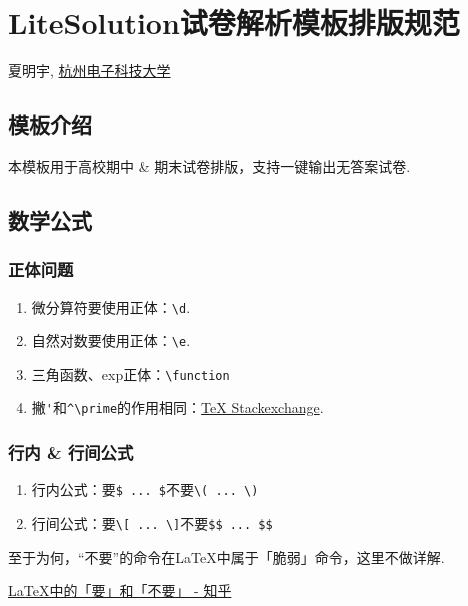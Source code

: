 \chapter*{LiteSolution试卷解析模板排版规范}%


\centerline{夏明宇, \href{https://www.hdu.edu.cn}{杭州电子科技大学}}
\yyyymmdddate
\centerline{}

\section{模板介绍}
本模板用于高校期中 \& 期末试卷排版，支持一键输出无答案试卷.

\section{数学公式}
\subsection{正体问题}
\begin{enumerate}
	\item 微分算符要使用正体：\verb|\d|.
	\item 自然对数要使用正体：\verb|\e|.
	\item 三角函数、exp正体：\verb|\function|
	\item 撇\verb|'|和\verb|^\prime|的作用相同：\href{https://tex.stackexchange.com/a/538413/299948}{TeX Stackexchange}.
\end{enumerate}

\subsection{行内 \& 行间公式}
\begin{enumerate}
	\item 行内公式：要\verb|$ ... $|不要\verb|\( ... \)|
	\item 行间公式：要\verb|\[ ... \]|不要\verb|$$ ... $$|
\end{enumerate}
至于为何，“不要”的命令在\LaTeX 中属于「脆弱」命令，这里不做详解.

\href{https://www.zhihu.com/question/27589739}{\LaTeX 中的「要」和「不要」 - 知乎}

